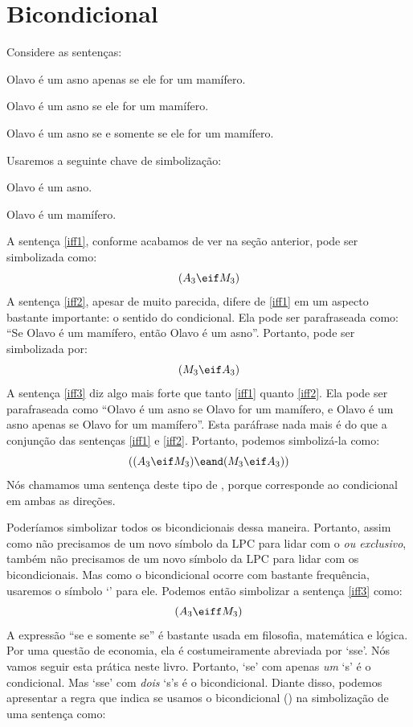 \section{Bicondicional}
Considere as sentenças:
	\begin{earg}
		\item[\ex{iff1}] Olavo é um asno apenas se ele for um mamífero.
		\item[\ex{iff2}] Olavo é um asno se ele for um mamífero.
		\item[\ex{iff3}] Olavo é um asno se e somente se ele for um mamífero.
	\end{earg}
Usaremos a seguinte chave de simbolização:
	\begin{ekey}
		\item[A_3] Olavo é um asno.
		\item[M_3] Olavo é um mamífero.
	\end{ekey}
A sentença \ref{iff1}, conforme acabamos de ver na seção anterior, pode ser simbolizada como:
$$(A_3 \eif M_3)$$
A sentença \ref{iff2}, apesar de muito parecida, difere de \ref{iff1} em um aspecto bastante importante:
o sentido do condicional.
Ela pode ser parafraseada como:
``Se Olavo é um mamífero, então Olavo é um asno''.
Portanto, pode ser simbolizada por:
$$(M_3 \eif A_3)$$
A sentença \ref{iff3} diz algo mais forte que tanto \ref{iff1} quanto \ref{iff2}.
Ela pode ser parafraseada como ``Olavo é um asno se Olavo for um mamífero, e Olavo é um asno apenas se Olavo for um mamífero''.
Esta paráfrase nada mais é do que a conjunção das sentenças \ref{iff1} e \ref{iff2}.
Portanto, podemos simbolizá-la como:
$$((A_3 \eif M_3) \eand (M_3 \eif A_3))$$
Nós chamamos uma sentença deste tipo de , porque corresponde ao condicional em ambas as direções.

Poderíamos simbolizar todos os bicondicionais dessa maneira.
Portanto, assim como não precisamos de um novo símbolo da LPC para lidar com o \emph{ou exclusivo}, também não precisamos de um novo símbolo da LPC para lidar com os bicondicionais.
Mas como o bicondicional ocorre com bastante frequência, usaremos o símbolo `\eiff' para ele.
Podemos então simbolizar a sentença \ref{iff3} como:
$$(A_3 \eiff M_3)$$
A expressão ``se e somente se'' é bastante usada em filosofia, matemática e lógica.
Por uma questão de economia, ela é costumeiramente abreviada por `sse'.
Nós vamos seguir esta prática neste livro.
Portanto, `se' com apenas \emph{um} `s' é o condicional.
Mas `sse' com \emph{dois} `s's é o bicondicional.
Diante disso, podemos apresentar a regra que indica se usamos o bicondicional (\eiff) na simbolização de uma sentença como:


